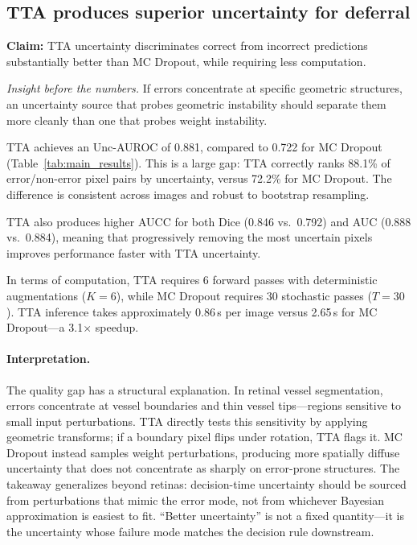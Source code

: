 \subsection{TTA produces superior uncertainty for deferral}
\label{sec:results_uncertainty}

\textbf{Claim:} TTA uncertainty discriminates correct from incorrect
predictions substantially better than MC Dropout, while requiring less
computation.

\emph{Insight before the numbers.} If errors concentrate at specific
geometric structures, an uncertainty source that probes geometric
instability should separate them more cleanly than one that probes
weight instability.

TTA achieves an Unc-AUROC of 0.881, compared to 0.722 for MC Dropout
(Table~\ref{tab:main_results}). This is a large gap: TTA correctly ranks
88.1\% of error/non-error pixel pairs by uncertainty, versus 72.2\% for
MC Dropout. The difference is consistent across images and robust to
bootstrap resampling.

TTA also produces higher AUCC for both Dice (0.846 vs.\ 0.792) and AUC
(0.888 vs.\ 0.884), meaning that progressively removing the most uncertain
pixels improves performance faster with TTA uncertainty.

In terms of computation, TTA requires 6 forward passes with deterministic
augmentations ($K = 6$), while MC Dropout requires 30 stochastic passes
($T = 30$). TTA inference takes approximately 0.86\,s per image versus
2.65\,s for MC Dropout---a 3.1$\times$ speedup.

\paragraph{Interpretation.} The quality gap has a structural explanation.
In retinal vessel segmentation, errors concentrate at vessel boundaries
and thin vessel tips---regions sensitive to small input perturbations. TTA
directly tests this sensitivity by applying geometric transforms; if a
boundary pixel flips under rotation, TTA flags it. MC Dropout instead
samples weight perturbations, producing more spatially diffuse uncertainty
that does not concentrate as sharply on error-prone structures. The
takeaway generalizes beyond retinas: decision-time uncertainty should be
sourced from perturbations that mimic the error mode, not from whichever
Bayesian approximation is easiest to fit. ``Better uncertainty'' is not a
fixed quantity---it is the uncertainty whose failure mode matches the
decision rule downstream.

